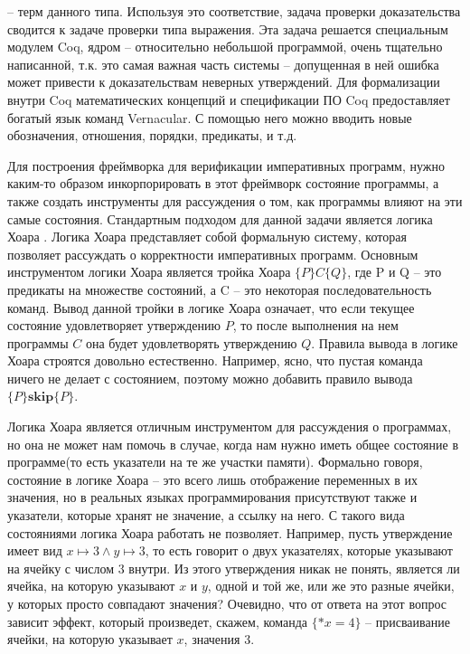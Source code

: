 -- терм данного типа. Используя это соответствие, задача проверки доказательства сводится к задаче проверки типа выражения. Эта задача
решается специальным модулем Coq, ядром -- относительно небольшой программой, очень тщательно написанной, т.к. это самая важная часть
системы -- допущенная в ней ошибка может привести к доказательствам неверных утверждений.
Для формализации внутри Coq математических концепций и спецификации ПО Coq предоставляет богатый язык команд Vernacular.
С помощью него можно вводить новые обозначения, отношения, порядки, предикаты, и т.д.
\par
Для построения фреймворка для верификации императивных программ, нужно каким-то образом инкорпорировать в этот фреймворк состояние программы,
а также создать инструменты для рассуждения о том, как программы влияют на эти самые состояния. Стандартным подходом для данной задачи
является логика Хоара \cite{Hoare}. Логика Хоара представляет собой формальную систему, которая позволяет рассуждать о корректности
императивных программ. Основным инструментом логики Хоара является тройка Хоара $\{P\}C\{Q\}$, где P и Q -- это предикаты на множестве состояний,
а C -- это некоторая последовательность команд. Вывод данной тройки в логике Хоара означает, что если текущее состояние удовлетворяет
утверждению $P$, то после выполнения на нем программы $C$ она будет удовлетворять утверждению $Q$. Правила вывода в логике Хоара
строятся довольно естественно. Например, ясно, что пустая команда ничего не делает с состоянием, поэтому можно добавить правило вывода
$\{P\}\textbf{skip}\{P\}$.
\par
Логика Хоара является отличным инструментом для рассуждения о программах, но она не может нам помочь в случае, когда нам нужно иметь
общее состояние в программе(то есть указатели на те же участки памяти). Формально говоря, состояние в логике Хоара -- это всего лишь
отображение переменных в их значения, но в реальных языках программирования присутствуют также и указатели, которые хранят не значение,
а ссылку на него. С такого вида состояниями логика Хоара работать не позволяет. Например, пусть утверждение имеет вид
$x \mapsto 3 \land y \mapsto 3$, то есть говорит о двух указателях, которые указывают на ячейку с числом $3$ внутри. Из этого утверждения
никак не понять, является ли ячейка, на которую указывают $x$ и $y$, одной и той же, или же это разные ячейки, у которых просто
совпадают значения? Очевидно, что от ответа на этот вопрос зависит эффект, который произведет, скажем, команда $\{*x = 4\}$ -- присваивание
ячейки, на которую указывает $x$, значения 3.
